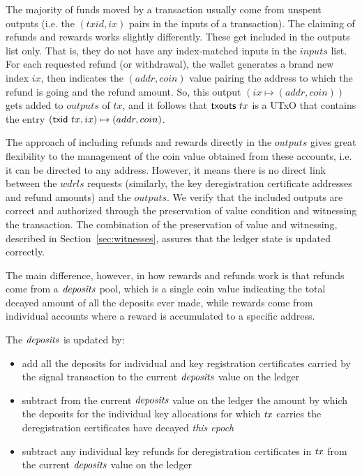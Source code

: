 \documentclass[11pt,a4paper,dvipsnames]{article}
\theoremstyle{definition}
\theoremstyle{definition}
\begin{document}
The majority of funds moved by a transaction usually come from unspent outputs
(i.e. the $(txid, ix)$ pairs in the inputs of a transaction). The claiming of
refunds and rewards works slightly differently. These get included in the outputs list
only. That is, they do not have any index-matched inputs in the $inputs$ list.
For each requested refund (or withdrawal), the
wallet generates a brand new index $ix$, then indicates the $(addr,coin)$ value
pairing the address to which the refund is going and the refund amount.
So, this output $(ix \mapsto (addr,coin))$ gets added to $outputs$ of $tx$,
and it follows that $\mathsf{txouts}~{tx}$ is a UTxO that contains the entry
$(\mathsf{txid}~{tx}, ix) \mapsto (addr,coin)$.

The approach of including refunds and rewards directly in the $outputs$ gives
great flexibility to the management of the coin value obtained from these
accounts, i.e. it can be directed to any address. However, it means there is no
direct link between the $wdrls$ requests (similarly, the key deregistration
certificate addresses and refund amounts) and the $outputs$. We verify that
the included outputs are correct and authorized through the preservation of value condition
and witnessing the transaction. The combination of the
preservation of value and witnessing, described in Section~\ref{sec:witnesses},
assures that the ledger state is updated correctly.

The main difference, however, in how rewards and refunds work is that refunds
come from a $\mathit{deposits}$ pool, which is a single coin value indicating
the total decayed amount of all the deposits ever made, while rewards come from individual
accounts where a reward is accumulated to a specific address.

The $\mathit{deposits}$ is updated by:

\begin{itemize}
\item add all the deposits for individual and key registration certificates
carried by the signal transaction to the current $\mathit{deposits}$ value on the ledger
\item subtract from the current $\mathit{deposits}$ value on the ledger
the amount by which the deposits for the individual key allocations
for which $\mathit{tx}$ carries the deregistration certificates have
decayed \textit{this epoch}
\item subtract any individual key refunds for deregistration certificates
in $\mathit{tx}$ from the current $\mathit{deposits}$ value on the ledger
\end{itemize}
\end{document}
